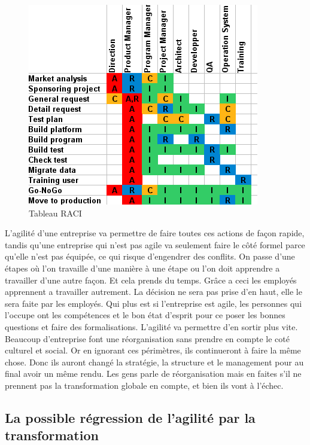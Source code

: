 \documentclass[12pt,a4paper]{article}
\begin{document}
\begin{figure}[h!]
\centering
\includegraphics[scale=0.7]{raci}
\caption{Tableau RACI}
\label{fig:raci}
\end{figure}

L'agilité d'une entreprise va permettre de faire toutes ces actions de façon rapide, tandis qu'une entreprise qui n'est pas agile va seulement faire le côté formel parce qu'elle n'est pas équipée, ce qui risque d'engendrer des conflits. On passe d'une étapes où l'on travaille d'une manière à une étape ou l'on doit apprendre a travailler d'une autre façon. Et cela prends du temps. Grâce a ceci les employés apprennent a travailler autrement. La décision ne sera pas prise d'en haut, elle le sera faite par les employés. Qui plus est si l'entreprise est agile, les personnes qui l'occupe ont les compétences et le bon état d'esprit pour ce poser les bonnes questions et faire des formalisations. L'agilité va permettre d'en sortir plus vite.\\ 
 
Beaucoup d'entreprise font une réorganisation sans prendre en compte le coté culturel et social. Or en ignorant ces périmètres, ils continueront à faire la même chose. Donc ils auront changé la stratégie, la structure et le management pour au final avoir un même rendu. Les gens parle de réorganisation mais en faites s'il ne prennent pas la transformation globale en compte, et bien ils vont à l'échec.\\

\subsection{La possible régression de l'agilité par la transformation}
\end{document}
